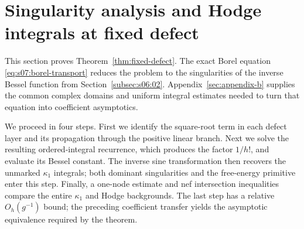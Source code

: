 \section{Singularity analysis and Hodge integrals at fixed defect}
\label{sec:s08}

This section proves Theorem~\ref{thm:fixed-defect}. The exact Borel
equation \eqref{eq:s07:borel-transport} reduces the problem to the
singularities of the inverse Bessel function from
Section~\ref{subsec:s06:02}. Appendix~\ref{sec:appendix-b} supplies
the common complex domains and uniform integral estimates needed to
turn that equation into coefficient asymptotics.

We proceed in four steps. First we identify the square-root term in
each defect layer and its propagation through the positive linear
branch. Next we solve the resulting ordered-integral recurrence,
which produces the factor $1/h!$, and evaluate its Bessel constant.
The inverse sine transformation then recovers the unmarked
$\kappa_1$ integrals; both dominant singularities and the free-energy
primitive enter this step. Finally, a one-node estimate and nef
intersection inequalities compare the entire $\kappa_1$ and Hodge
backgrounds. The last step has a relative $O_h(g^{-1})$ bound;
the preceding coefficient transfer yields the asymptotic equivalence
required by the theorem.







